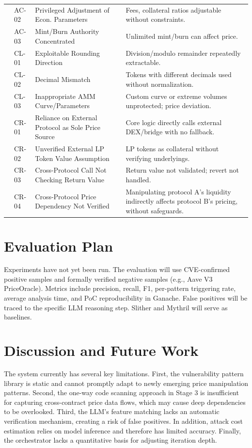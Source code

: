 \documentclass[10pt]{article}
\begin{document}
\begin{xltabular}{\textwidth}{
  >{\raggedright\arraybackslash}p{2.1cm}
  >{\raggedright\arraybackslash}p{1.1cm}
  >{\raggedright\arraybackslash}p{4.7cm}
  >{\raggedright\arraybackslash}X
}
& AC-02 & Privileged Adjustment of Econ. Parameters & Fees, collateral ratios adjustable without constraints. \\
& AC-03 & Mint/Burn Authority Concentrated & Unlimited mint/burn can affect price. \\
\midrule
{} & CL-01 & Exploitable Rounding Direction & Division/modulo remainder repeatedly extractable. \\
& CL-02 & Decimal Mismatch & Tokens with different decimals used without normalization. \\
& CL-03 & Inappropriate AMM Curve/Parameters & Custom curve or extreme volumes unprotected; price deviation. \\
\midrule
{} & CR-01 & Reliance on External Protocol as Sole Price Source & Core logic directly calls external DEX/bridge with no fallback. \\
& CR-02 & Unverified External LP Token Value Assumption & LP tokens as collateral without verifying underlyings. \\
& CR-03 & Cross-Protocol Call Not Checking Return Value & Return value not validated; revert not handled. \\
& CR-04 & Cross-Protocol Price Dependency Not Verified & Manipulating protocol A's liquidity indirectly affects protocol B's pricing, without safeguards. \\
\end{xltabular}

\section{Evaluation Plan}
Experiments have not yet been run. The evaluation will use CVE-confirmed positive samples and formally verified negative samples (e.g., Aave V3 PriceOracle). Metrics include precision, recall, F1, per-pattern triggering rate, average analysis time, and PoC reproducibility in Ganache. False positives will be traced to the specific LLM reasoning step. Slither and Mythril will serve as baselines.

\section{Discussion and Future Work}
The system currently has several key limitations. First, the vulnerability pattern library is static and cannot promptly adapt to newly emerging price manipulation patterns. Second, the one-way code scanning approach in Stage 3 is insufficient for capturing cross-contract price data flows, which may cause deep dependencies to be overlooked. Third, the LLM’s feature matching lacks an automatic verification mechanism, creating a risk of false positives. In addition, attack cost estimation relies on model inference and therefore has limited accuracy. Finally, the orchestrator lacks a quantitative basis for adjusting iteration depth.
\end{document}
